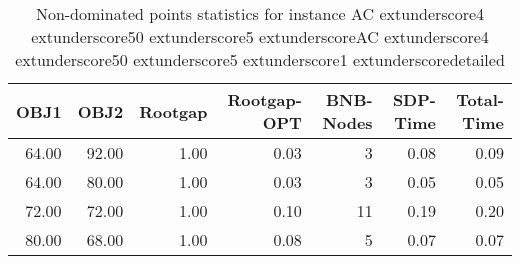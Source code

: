 \begin{table}
\caption{Non-dominated points statistics for instance AC	extunderscore4	extunderscore50	extunderscore5	extunderscoreAC	extunderscore4	extunderscore50	extunderscore5	extunderscore1	extunderscoredetailed}
\label{tab:stats/AC_4_50_5_AC_4_50_5_1_detailed}
\begin{tabular}{rrrrrrr}
\toprule
OBJ1 & OBJ2 & Rootgap & Rootgap-OPT & BNB-Nodes & SDP-Time & Total-Time \\
\midrule
64.00 & 92.00 & 1.00 & 0.03 & 3 & 0.08 & 0.09 \\
64.00 & 80.00 & 1.00 & 0.03 & 3 & 0.05 & 0.05 \\
72.00 & 72.00 & 1.00 & 0.10 & 11 & 0.19 & 0.20 \\
80.00 & 68.00 & 1.00 & 0.08 & 5 & 0.07 & 0.07 \\
\bottomrule
\end{tabular}
\end{table}
